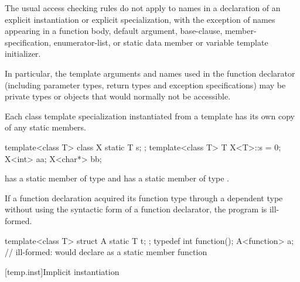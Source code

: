 \pnum
The usual access checking rules do not apply to names
in a declaration of an explicit instantiation or explicit specialization,
with the exception of names appearing in a function body,
default argument, base-clause, member-specification, enumerator-list,
or static data member or variable template initializer.
\begin{note}
In particular, the template arguments and names
used in the function declarator
(including parameter types, return types and exception specifications)
may be private types or objects that would normally not be accessible.
\end{note}

\pnum
Each class template specialization instantiated from a template has its own
copy of any static members.
\begin{example}

\begin{codeblock}
template<class T> class X {
  static T s;
};
template<class T> T X<T>::s = 0;
X<int> aa;
X<char*> bb;
\end{codeblock}

has a static member
of type
and
has a static member
of type
.
\end{example}

\pnum
If a function declaration acquired its function type through
a dependent type without using the syntactic form of
a function declarator, the program is ill-formed.
\begin{example}

\begin{codeblock}
template<class T> struct A {
  static T t;
};
typedef int function();
A<function> a;      // ill-formed: would declare  as a static member function
\end{codeblock}
\end{example}

[temp.inst]{Implicit instantiation}

